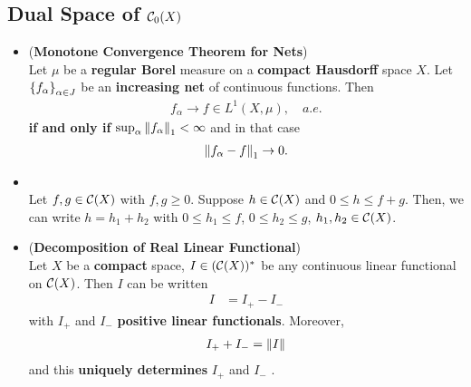 \documentclass[11pt]{article}
\begin{document}
\subsection{Dual Space of ${\mathcal C}_0(X)$}
\begin{itemize}
\item \begin{theorem} (\textbf{Monotone Convergence Theorem for Nets}) \citep{reed1980methods}\\
Let $\mu$ be a \textbf{regular Borel} measure on a \textbf{compact Hausdorff} space $X$. Let $\left\{f_{\alpha}\right\}_{\alpha \in J}$ be an \textbf{increasing net} of continuous functions.  Then
\begin{align*}
f_{\alpha} \rightarrow f  \in L^1(X, \mu), \quad a.e.
\end{align*}  \textbf{if and only if} $\sup_{\alpha}\left\|f_{\alpha}\right\|_{1} < \infty$ and in that case
\begin{align*}
\left\|f_\alpha - f\right\|_{1} \rightarrow 0.
\end{align*}
\end{theorem}

\item \begin{lemma} \citep{reed1980methods}\\
Let $f,g \in {\mathcal C}(X)$ with $f, g \ge 0$. Suppose $h \in {\mathcal C}(X)$ and $0 \le h \le f + g$. 
Then, we can write $h = h_1 + h_2$ with $0\le h_1 \le f$, $0 \le h_2 \le g$,  $h_1, h_2 \in {\mathcal C}(X)$. 
\end{lemma}

\item \begin{theorem}  (\textbf{Decomposition of Real Linear Functional}) \citep{reed1980methods, folland2013real}\\
Let  $X$ be a \textbf{compact} space, $I \in ({\mathcal C}(X))^{*}$ be any continuous linear functional on ${\mathcal C}(X)$. Then $I$ can be written 
\begin{align*}
I &= I_{+} - I_{-}
\end{align*}
with $I_{+}$ and $I_{-}$ \textbf{positive linear functionals}. Moreover, 
\begin{align*}
I_{+} + I_{-}= \left\|I\right\|_{}
\end{align*}
and this \textbf{uniquely determines} $I_{+}$ and $I_{-}$ . 
\end{theorem}


\end{itemize}
\end{document}
